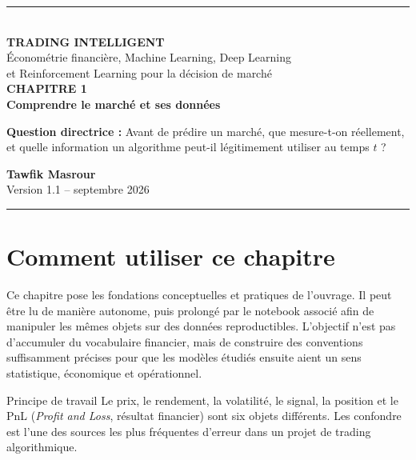 \documentclass[11pt,a4paper,oneside]{book}
\begin{document}
\begin{titlepage}
\thispagestyle{empty}
\vspace*{1.4cm}
{\color{AcademicBlue}\rule{\textwidth}{2pt}}\\[1.25cm]
{\Huge\bfseries\color{AcademicBlue} TRADING INTELLIGENT}\\[0.45cm]
{\Large Économétrie financière, Machine Learning, Deep Learning\\
et Reinforcement Learning pour la décision de marché}\\[2.2cm]
{\Huge\bfseries CHAPITRE 1}\\[0.4cm]
{\LARGE\bfseries\color{Petrol} Comprendre le marché et ses données}\\[1.6cm]
\begin{tcolorbox}[colback=PaleBlue,colframe=AcademicBlue,boxrule=0.8pt,arc=2mm]
\centering
\textbf{Question directrice :} Avant de prédire un marché, que mesure-t-on réellement, et quelle information un algorithme peut-il légitimement utiliser au temps $t$ ?
\end{tcolorbox}
\vfill
{\large\textbf{Tawfik Masrour}}\\[0.75cm]
{\small\textcolor{MidGray}{Version 1.1 -- septembre 2026}}\\[0.35cm]
{\color{AcademicBlue}\rule{\textwidth}{2pt}}
\end{titlepage}

\frontmatter
\chapter*{Comment utiliser ce chapitre}
Ce chapitre pose les fondations conceptuelles et pratiques de l'ouvrage. Il peut être lu de manière autonome, puis prolongé par le notebook associé afin de manipuler les mêmes objets sur des données reproductibles. L'objectif n'est pas d'accumuler du vocabulaire financier, mais de construire des conventions suffisamment précises pour que les modèles étudiés ensuite aient un sens statistique, économique et opérationnel.

\begin{takeawaybox}{Principe de travail}
Le prix, le rendement, la volatilité, le signal, la position et le PnL (\emph{Profit and Loss}, résultat financier) sont six objets différents. Les confondre est l'une des sources les plus fréquentes d'erreur dans un projet de trading algorithmique.
\end{takeawaybox}

\tableofcontents

\mainmatter







\backmatter

\end{document}
